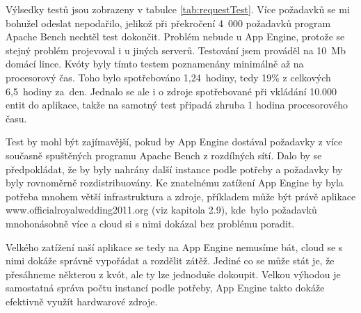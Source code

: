 Výlsedky testů jsou zobrazeny v tabulce \ref{tab:requestTest}. Více požadavků se mi bohužel odeslat nepodařilo, jelikož při překročení 4~000 požadavků program Apache Bench nechtěl test dokončit. Problém nebude u App Engine, protože se stejný problém projevoval i u jiných serverů. Testování jsem prováděl na 10~Mb domácí lince. Kvóty byly tímto testem poznamenány minimálně až na procesorový čas. Toho bylo spotřebováno 1,24~hodiny, tedy 19\% z celkových 6,5~hodiny za~den. Jednalo se ale i o zdroje spotřebované při vkládání 10.000 entit do aplikace, takže na samotný test připadá zhruba 1 hodina procesorového času.

Test by mohl být zajímavější, pokud by App Engine dostával požadavky z více současně spuštěných programu Apache Bench z rozdílných sítí. Dalo by se předpokládat, že by byly nahrány další instance podle potřeby a požadavky by byly rovnoměrně rozdistribuovány. Ke znatelnému zatížení App Engine by byla potřeba mnohem větší infrastruktura a zdroje, příkladem může být právě aplikace www.officialroyalwedding2011.org (viz kapitola 2.9), kde~bylo požadavků mnohonásobně více a cloud si s nimi dokázal bez problému poradit.

Velkého zatížení naší aplikace se tedy na App Engine nemusíme bát, cloud se s nimi dokáže správně vypořádat a rozdělit zátěž. Jediné co se může stát je, že přesáhneme některou z kvót, ale ty lze jednoduše dokoupit. Velkou výhodou je samostatná správa počtu instancí podle potřeby, App Engine takto dokáže efektivně využít hardwarové zdroje.
